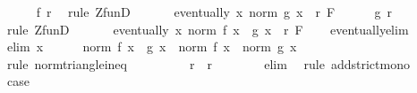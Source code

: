 \begin{isabellebody}
\ \ \ \ \isamarkupfalse%
\ f\ r\ \isamarkupfalse%
\ {\isacharparenleft}{\kern0pt}rule\ ZfunD{\isacharparenright}{\kern0pt}\isanewline
\ \ \isamarkupfalse%
\isanewline
\ \ \isamarkupfalse%
\ {\isachardoublequoteopen}eventually\ {\isacharparenleft}{\kern0pt}{\isasymlambda}x{\isachardot}{\kern0pt}\ norm\ {\isacharparenleft}{\kern0pt}g\ x{\isacharparenright}{\kern0pt}\ {\isacharless}{\kern0pt}\ r{\isacharslash}{\kern0pt}{}{\isacharparenright}{\kern0pt}\ F{\isachardoublequoteclose}\isanewline
\ \ \ \ \isamarkupfalse%
\ g\ r\ \isamarkupfalse%
\ {\isacharparenleft}{\kern0pt}rule\ ZfunD{\isacharparenright}{\kern0pt}\isanewline
\ \ \isamarkupfalse%
\isanewline
\ \ \isamarkupfalse%
\ {\isachardoublequoteopen}eventually\ {\isacharparenleft}{\kern0pt}{\isasymlambda}x{\isachardot}{\kern0pt}\ norm\ {\isacharparenleft}{\kern0pt}f\ x\ {\isacharplus}{\kern0pt}\ g\ x{\isacharparenright}{\kern0pt}\ {\isacharless}{\kern0pt}\ r{\isacharparenright}{\kern0pt}\ F{\isachardoublequoteclose}\isanewline
\ \ \isamarkupfalse%
\ eventually{\isacharunderscore}{\kern0pt}elim\isanewline
\ \ \ \ \isamarkupfalse%
\ {\isacharparenleft}{\kern0pt}elim\ x{\isacharparenright}{\kern0pt}\isanewline
\ \ \ \ \isamarkupfalse%
\ {\isachardoublequoteopen}norm\ {\isacharparenleft}{\kern0pt}f\ x\ {\isacharplus}{\kern0pt}\ g\ x{\isacharparenright}{\kern0pt}\ {\isasymle}\ norm\ {\isacharparenleft}{\kern0pt}f\ x{\isacharparenright}{\kern0pt}\ {\isacharplus}{\kern0pt}\ norm\ {\isacharparenleft}{\kern0pt}g\ x{\isacharparenright}{\kern0pt}{\isachardoublequoteclose}\isanewline
\ \ \ \ \ \ \isamarkupfalse%
\ {\isacharparenleft}{\kern0pt}rule\ norm{\isacharunderscore}{\kern0pt}triangle{\isacharunderscore}{\kern0pt}ineq{\isacharparenright}{\kern0pt}\isanewline
\ \ \ \ \isamarkupfalse%
\ \isamarkupfalse%
\ {\isachardoublequoteopen}{\isasymdots}\ {\isacharless}{\kern0pt}\ r{\isacharslash}{\kern0pt}{}\ {\isacharplus}{\kern0pt}\ r{\isacharslash}{\kern0pt}{}{\isachardoublequoteclose}\isanewline
\ \ \ \ \ \ \isamarkupfalse%
\ elim\ \isamarkupfalse%
\ {\isacharparenleft}{\kern0pt}rule\ add{\isacharunderscore}{\kern0pt}strict{\isacharunderscore}{\kern0pt}mono{\isacharparenright}{\kern0pt}\isanewline
\ \ \ \ \isamarkupfalse%
\ \isamarkupfalse%
\ {\isacharquery}{\kern0pt}case\isanewline

\end{isabellebody}
